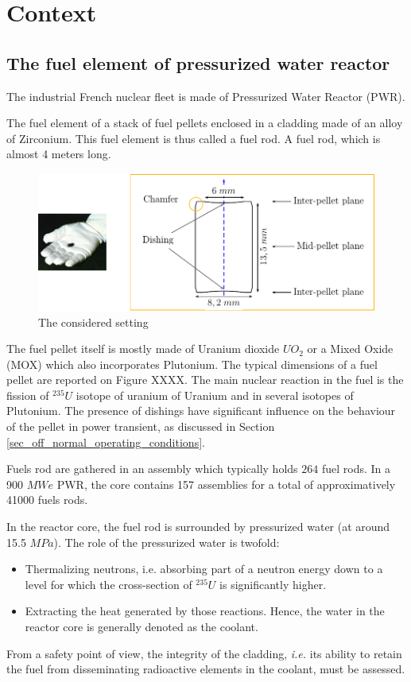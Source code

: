 \section{Context}

\subsection{The fuel element of pressurized water reactor}

The industrial French nuclear fleet is made of Pressurized Water Reactor
(PWR).

The fuel element of a stack of fuel pellets enclosed in a cladding made
of an alloy of Zirconium. This fuel element is thus called a fuel rod. A
fuel rod, which is almost 4 meters long.

\begin{figure}[h!]
    \centering
    \includegraphics[width=7.cm]{img/fig_context_0.pdf}
    \caption{The considered setting}
    \label{fig_context_0}
\end{figure}

The fuel pellet itself is mostly made of Uranium dioxide $UO_{2}$ or a
Mixed Oxide (MOX) which also incorporates Plutonium. The typical
dimensions of a fuel pellet are reported on Figure XXXX.
The main nuclear reaction in the fuel is the fission of
$\mbox{}^{235}U$ isotope of uranium of Uranium and in several isotopes
of Plutonium. The presence of dishings have significant influence on the
behaviour of the pellet in power transient, as discussed in Section
\ref{sec_off_normal_operating_conditions}.

Fuels rod are gathered in an assembly which typically holds $264$ fuel
rods. In a 900 $MWe$ PWR, the core contains 157 assemblies for a
total of approximatively 41000 fuels rods.

In the reactor core, the fuel rod is surrounded by pressurized water (at
around 15.5 $MPa$). The role of the pressurized water is twofold:
\begin{itemize}
    \item Thermalizing neutrons, i.e. absorbing part of a neutron energy down to
    a level for which the cross-section of $\mbox{}^{235}U$ is
    significantly higher\footnotemark[0].
    \item Extracting the heat generated by those reactions. Hence, the water in
    the reactor core is generally denoted as the coolant.
\end{itemize}
From a safety point of view, the integrity of the cladding, \textit{i.e.} its
ability to retain the fuel from disseminating radioactive elements in
the coolant, must be assessed.

